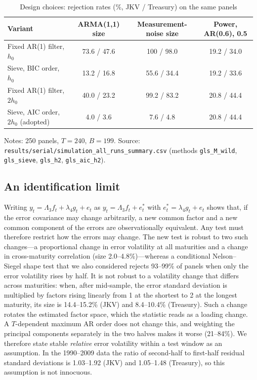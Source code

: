 \documentclass[11pt]{article}
\begin{document}
\begin{table}[htbp]
\centering
\begin{threeparttable}
\small
\caption{Design choices: rejection rates (\%, JKV / Treasury) on the same panels}\label{tab.robust.abl}
\begin{tabular}{lccc}
\toprule
Variant & ARMA(1,1) size & Measurement-noise size & Power, AR(0.6), 0.5\\
\midrule
Fixed AR(1) filter, $h_0$ & 73.6 / 47.6 & 100 / 98.0 & 19.2 / 34.0\\
Sieve, BIC order, $h_0$ & 13.2 / 16.8 & 55.6 / 34.4 & 19.2 / 33.6\\
Fixed AR(1) filter, $2h_0$ & 40.0 / 23.2 & 99.2 / 83.2 & 20.8 / 44.4\\
Sieve, AIC order, $2h_0$ (adopted) & 4.0 / 3.6 & 7.6 / 4.8 & 20.8 / 44.4\\
\bottomrule
\end{tabular}
\begin{tablenotes}\small
\item Notes: 250 panels, $T=240$, $B=199$. Source: \texttt{results/serial/simulation\_all\_runs\_summary.csv} (methods \texttt{gls\_M\_wild}, \texttt{gls\_sieve}, \texttt{gls\_h2}, \texttt{gls\_aic\_h2}).
\end{tablenotes}
\end{threeparttable}
\end{table}

\subsection{An identification limit}\label{sec.robust.ident}

Writing $y_t=\Lambda_3f_t+\lambda_4g_t+e_t$ as $y_t=\Lambda_3f_t+e^*_t$ with $e^*_t=\lambda_4g_t+e_t$ shows that, if the error covariance may change arbitrarily, a new common factor and a new common component of the errors are observationally equivalent. Any test must therefore restrict how the errors may change. The new test is robust to two such changes---a proportional change in error volatility at all maturities and a change in cross-maturity correlation (size 2.0--4.8\%)---whereas a conditional Nelson--Siegel shape test that we also considered rejects 93--99\% of panels when only the error volatility rises by half. It is not robust to a volatility change that differs across maturities: when, after mid-sample, the error standard deviation is multiplied by factors rising linearly from 1 at the shortest to 2 at the longest maturity, its size is 14.4--15.2\% (JKV) and 8.4--10.4\% (Treasury). Such a change rotates the estimated factor space, which the statistic reads as a loading change. A $T$-dependent maximum AR order does not change this, and weighting the principal components separately in the two halves makes it worse (21--84\%). We therefore state stable \emph{relative} error volatility within a test window as an assumption. In the 1990--2009 data the ratio of second-half to first-half residual standard deviations is 1.03--1.92 (JKV) and 1.05--1.48 (Treasury), so this assumption is not innocuous.
\end{document}

